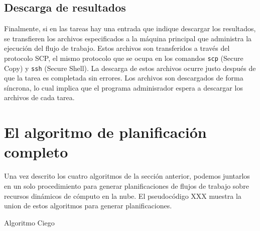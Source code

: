 \subsection{Descarga de resultados}

Finalmente, si en las tareas hay una entrada que indique descargar los resultados, se transfieren los archivos especificados a la máquina principal que administra la ejecuci\'on del flujo de trabajo. Estos archivos son transferidos a trav\'es del protocolo SCP, el mismo protocolo \cite{rfc4251} que se ocupa en los comandos \texttt{scp} (Secure Copy) y \texttt{ssh} (Secure Shell). La descarga de estos archivos ocurre justo despu\'es de que la tarea es completada sin errores. Los archivos son descargados de forma s\'incrona, lo cual implica que el programa adminisrador espera a descargar los archivos de cada tarea.


\section{El algoritmo de planificaci\'on completo}

Una vez descrito los cuatro algoritmos de la secci\'on anterior, podemos juntarlos en un solo procedimiento para generar planificaciones de flujos de trabajo sobre recursos din\'amicos de c\'omputo en la nube. El pseudoc\'odigo XXX muestra la union de estos algoritmos para generar planificaciones.


\begin{algorithm}
\caption{Algoritmo Ciego}
\label{alg_blind_main}
\begin{algorithmic}
\EndProcedure
\end{algorithmic}
\end{algorithm}


